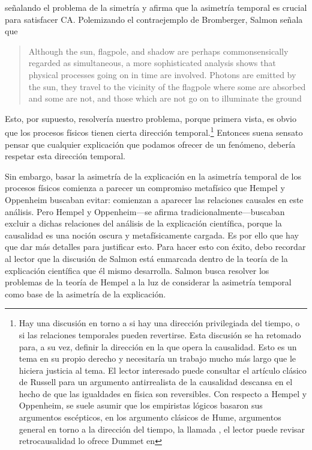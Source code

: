 señalando el problema de la simetría y afirma que la
asimetría temporal es crucial para satisfacer CA. Polemizando el contraejemplo de
Bromberger, Salmon señala que

 \begin{quote}
    Although the sun, flagpole, and shadow are perhaps
    commonsensically regarded as simultaneous, a more
    sophisticated analysis shows that physical processes
    going on in time are involved.	Photons are emitted by
    the sun, they travel to the	vicinity of the flagpole
    where some are absorbed and some are not, and those
    which are not go on to illuminate the ground
 \end{quote}

Esto, por supuesto, resolvería nuestro problema, porque
primera vista, es obvio que los procesos físicos tienen
cierta dirección temporal.\footnote{
  Hay una discusión en torno a si hay una dirección
  privilegiada del tiempo, o si las relaciones temporales
  pueden revertirse. Esta discusión se ha retomado para, a
  su vez, definir la dirección en la que opera la
  causalidad. Esto es un tema en su propio derecho y
  necesitaría un trabajo mucho más largo que le hiciera
  justicia al tema. El lector interesado puede consultar el
  artículo clásico de Russell para un argumento
  antirrealista de la causalidad
  descansa en el hecho de que las igualdades en física son
  reversibles. Con respecto a Hempel y Oppenheim, se suele
  asumir que los empiristas lógicos basaron sus argumentos
  escépticos, en los argumento clásicos de Hume, argumentos
  general en torno a la dirección del tiempo, la llamada
  , el lector puede revisar
  retrocausalidad lo ofrece Dummet en
}
Entonces suena sensato pensar que cualquier explicación que podamos
ofrecer de un fenómeno, debería respetar esta dirección
temporal.

Sin embargo, basar la asimetría de la explicación en la
asimetría temporal de los procesos físicos comienza a
parecer un compromiso metafísico que Hempel y Oppenheim
buscaban evitar: comienzan a aparecer las relaciones
causales en este análisis. Pero
Hempel y Oppenheim---se afirma tradicionalmente---buscaban
excluir a dichas relaciones del análisis de la explicación científica, porque la
causalidad es una noción oscura y metafísicamente cargada.
Es por ello que hay que dar más detalles para justificar
esto. Para hacer
esto con éxito, debo recordar al lector que la discusión de
Salmon está enmarcada dentro de la teoría de la explicación
científica que él mismo desarrolla. Salmon busca resolver
los problemas de la teoría de Hempel a la luz de considerar
la asimetría temporal como base de la asimetría de la explicación.

